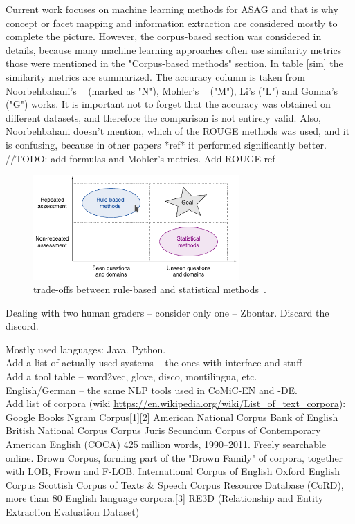 \documentclass[11pt]{report}
\numberwithin{equation}{section} %
\begin{document}
Current work focuses on machine learning methods for ASAG and that is why concept or facet mapping and information extraction are considered mostly to complete the picture. However, the corpus-based section was considered in details, because many machine learning approaches often use similarity metrics those were mentioned in the "Corpus-based methods" section. In table \ref{sim} the similarity metrics are summarized. The accuracy column is taken from Noorbehbahani's ~\cite{Noorbehbahani} (marked as "N"), Mohler's ~\cite{Mohler} ("M"), Li's ("L") and Gomaa's ("G") works. It is important not to forget that the accuracy was obtained on different datasets, and therefore the comparison is not entirely valid. Also, Noorbehbahani doesn't mention, which of the ROUGE methods was used, and it is confusing, because in other papers *ref* it performed significantly better. //TODO: add formulas and  Mohler's metrics. Add ROUGE ref\\

\begin{figure}[h!]
  \centering
  \includegraphics[width=0.7\textwidth]{img/ruleVSstat}
    \caption{  trade-offs between rule-based and statistical methods~\cite{Burrows}. }\label{fig:rVSs}
\end{figure}

Dealing with two human graders -- consider only one -- Zbontar. Discard the discord.

Mostly used languages: Java. Python.\\

Add a list of actually used systems -- the ones with interface and stuff\\

Add a tool table -- word2vec, glove, disco, montilingua, etc.\\

English/German -- the same NLP tools used in CoMiC-EN and -DE. \\

Add list of corpora (wiki \url{https://en.wikipedia.org/wiki/List_of_text_corpora}):
Google Books Ngram Corpus[1][2]
American National Corpus
Bank of English
British National Corpus
Corpus Juris Secundum
Corpus of Contemporary American English (COCA) 425 million words, 1990–2011. Freely searchable online.
Brown Corpus, forming part of the "Brown Family" of corpora, together with LOB, Frown and F-LOB.
International Corpus of English
Oxford English Corpus
Scottish Corpus of Texts \& Speech
Corpus Resource Database (CoRD), more than 80 English language corpora.[3]
RE3D (Relationship and Entity Extraction Evaluation Dataset)
\end{document}
